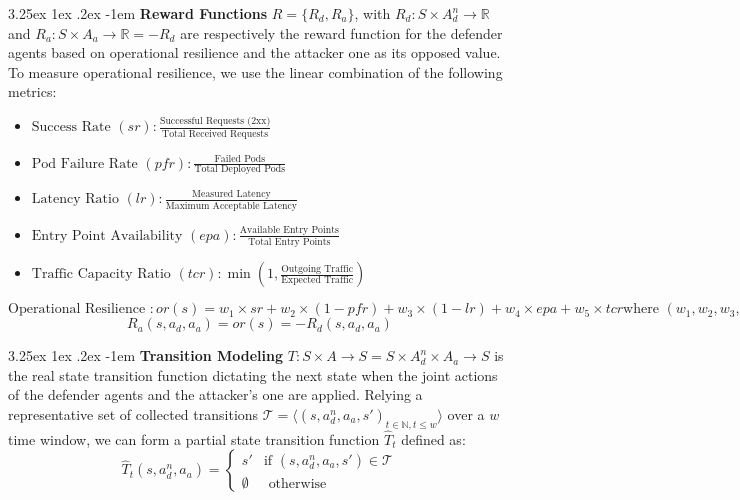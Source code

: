 \documentclass[conference]{IEEEtran}
\makeatletter
\renewcommand\paragraph{\@startsection{paragraph}{5}{\z@}%
  {3.25ex \@plus1ex \@minus.2ex}%
  {-1em}%
  {\normalfont\normalsize\bfseries}}
\makeatother
\begin{document}
\noindent \paragraph{\textbf{Reward Functions}} $R = \{R_d, R_a\}$, with $R_d: S \times A_d^n \to \mathbb{R}$ and $R_a: S \times A_a \to \mathbb{R} = - R_d$ are respectively the reward function for the defender agents based on operational resilience and the attacker one as its opposed value.
To measure operational resilience, we use the linear combination of the following metrics:
%
\begin{itemize}
    \item $\text{Success Rate } (sr) : \frac{\text{Successful Requests (2xx)}}{\text{Total Received Requests}}$

    \item $\text{Pod Failure Rate } (pfr) : \frac{\text{Failed Pods}}{\text{Total Deployed Pods}}$
    
    \item $\text{Latency Ratio } (lr) : \frac{\text{Measured Latency}}{\text{Maximum Acceptable Latency}}$
    
    \item $\text{Entry Point Availability } (epa) : \frac{\text{Available Entry Points}}{\text{Total Entry Points}}$
    
    \item $\text{Traffic Capacity Ratio } (tcr) : \min\left(1, \frac{\text{Outgoing Traffic}}{\text{Expected Traffic}}\right)$
\end{itemize}
%
$\text{Operational Resilience }: or(s) = w_1 \times sr
\allowbreak + w_2 \times (1 - pfr)
\allowbreak + w_3 \times (1 - lr)
\allowbreak + w_4 \times epa
\allowbreak + w_5 \times tcr
\text{where } (w_1, w_2, w_3, w_4, w_5) \text{ are relative weights.}$
$$
R_a(s, a_d, a_a) = or(s) = -R_d(s, a_d, a_a)
$$

\noindent \paragraph{\textbf{Transition Modeling}} $T: S \times A \rightarrow S = S \times A_d^n \times A_a \to S$ is the real state transition function dictating the next state when the joint actions of the defender agents and the attacker's one are applied. Relying a representative set of collected transitions $\mathcal{T} = \langle(s, a_d^n, a_a, s')_{t\in \mathbb{N}, t \leq w}\rangle$ over a $w$ time window, we can form a partial state transition function $\hat{T}_t$ defined as:
%
$$
\hat{T}_t(s, a_d^n, a_a) =
\begin{cases} 
    s' & \text{if } (s, a_d^n, a_a, s') \in \mathcal{T} \\
    \emptyset & \text{ otherwise}
\end{cases}
$$
\end{document}
